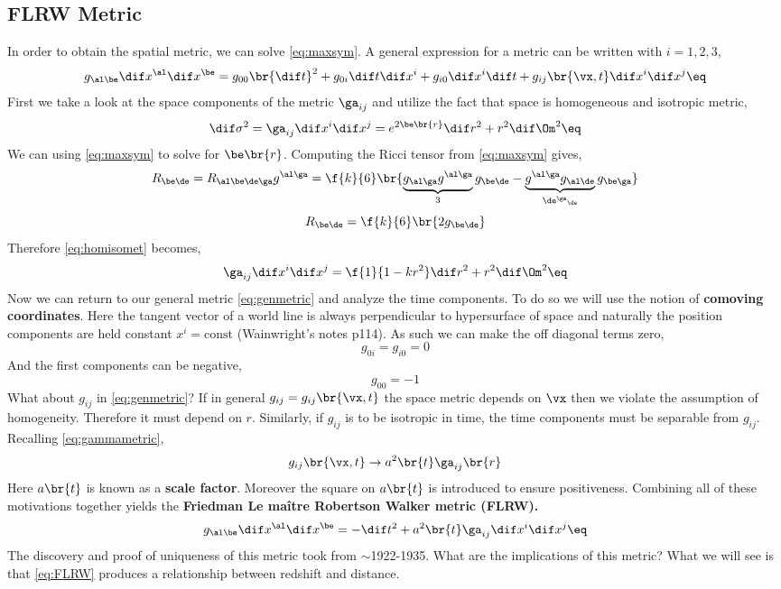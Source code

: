 \documentclass{article}
\begin{document}
\subsection{FLRW Metric}
In order to obtain the spatial metric, we can solve \eqref{eq:maxsym}. A general expression for a metric can be written with $i = 1,2,3$,
\[ g_{\al\be} \dif x^\al \dif x^\be = g_{00}\br{\dif t}^2 + g_{0i}\dif t \dif x^i + g_{i0} \dif x^i \dif t + g_{ij}\br{\vx,t}\dif x^i \dif x^j \eq \label{eq:genmetric}\]
First we take a look at the space components of the metric $\ga_{ij}$ and utilize the fact that space is homogeneous and isotropic metric,
\[ \dif \sigma^2 = \ga_{ij} \dif x^i \dif x^j = e^{2 \be \br{r}} \dif r^2 + r^2 \dif \Om^2 \eq \label{eq:homisomet} \]
We can using \eqref{eq:maxsym} to solve for $\be \br{r}$. Computing the Ricci tensor from \eqref{eq:maxsym} gives,
\[ R_{\be \de} = R_{\al\be\de\ga} g^{\al\ga} = \f{k}{6}\br{\underbrace{g_{\al\ga} g^{\al\ga}}_{3} g_{\be\de} - \underbrace{g^{\al\ga} g_{\al\de}}_{{\de^\ga}_\de} g_{\be\ga}} \]
\[ R_{\be \de} = \f{k}{6} \br{2 g_{\be \de}} \]
Therefore \eqref{eq:homisomet} becomes,
\[ \ga_{ij} \dif x^i \dif x^j = \f{1}{1 - k r^2} \dif r^2 + r^2 \dif \Om^2 \eq\label{eq:gammametric}\]
Now we can return to our general metric \eqref{eq:genmetric} and analyze the time components. To do so we will use the notion of \textbf{comoving coordinates}. Here the tangent vector of a world line is always perpendicular to hypersurface of space and naturally the position components are held constant $x^i = \text{const}$ (Wainwright's notes p114). As such we can make the off diagonal terms zero,
\[ g_{0i} = g_{i0} = 0 \]
And the first components can be negative,
\[ g_{00} = -1 \]
What about $g_{ij}$ in \eqref{eq:genmetric}? If in general $g_{ij} = g_{ij}\br{\vx, t}$ the space metric depends on $\vx$ then we violate the assumption of homogeneity. Therefore it must depend on $r$. Similarly, if $g_{ij}$ is to be isotropic in time, the time components must be separable from $g_{ij}$. Recalling \eqref{eq:gammametric},
\[ g_{ij}\br{\vx, t} \to a^2 \br{t} \ga_{ij}\br{r} \]
Here $a\br{t}$ is known as a \textbf{scale factor}. Moreover the square on $a\br{t}$ is introduced to ensure positiveness. Combining all of these motivations together yields the \textbf{Friedman Le maître Robertson Walker metric (FLRW).}
\[ g_{\al\be} \dif x^\al \dif x^\be = -\dif t^2 + a^2\br{t} \ga_{ij} \dif x^i \dif x^j \eq \label{eq:FLRW} \]
The discovery and proof of uniqueness of this metric took from $\sim$1922-1935. What are the implications of this metric? What we will see is that \eqref{eq:FLRW} produces a relationship between redshift and distance.
\end{document}
